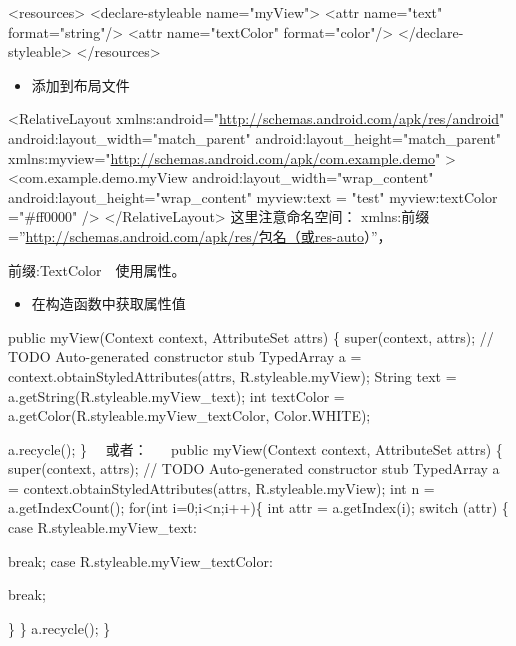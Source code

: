 \documentclass[9pt, b5paper]{article}
\begin{document}
<resources>
    <declare-styleable name="myView">
        <attr name="text" format="string"/>
        <attr name="textColor" format="color"/>
    </declare-styleable>
</resources>
\begin{itemize}
\item 添加到布局文件
\end{itemize}
<RelativeLayout xmlns:android="\url{http://schemas.android.com/apk/res/android}"
    android:layout\_width="match\_parent"
    android:layout\_height="match\_parent"
    xmlns:myview="\url{http://schemas.android.com/apk/com.example.demo}"
    >
     <com.example.demo.myView
         android:layout\_width="wrap\_content"
         android:layout\_height="wrap\_content" 
         myview:text = "test"
         myview:textColor ="\#ff0000"
         />
</RelativeLayout>
这里注意命名空间：
xmlns:前缀=”\url{http://schemas.android.com/apk/res/包名（或res-auto}）”，

前缀:TextColor　使用属性。
\begin{itemize}
\item 在构造函数中获取属性值
\end{itemize}
public myView(Context context, AttributeSet attrs) \{
        super(context, attrs);
        // TODO Auto-generated constructor stub
        TypedArray a = context.obtainStyledAttributes(attrs, R.styleable.myView); 
        String text = a.getString(R.styleable.myView\_text); 
        int textColor = a.getColor(R.styleable.myView\_textColor, Color.WHITE); 

        a.recycle();
    \}
　或者：
　
    public myView(Context context, AttributeSet attrs) \{
        super(context, attrs);
        // TODO Auto-generated constructor stub
        TypedArray a = context.obtainStyledAttributes(attrs, R.styleable.myView); 
        int n = a.getIndexCount();
        for(int i=0;i<n;i++)\{
            int attr = a.getIndex(i);
            switch (attr) \{
            case R.styleable.myView\_text:

    break;
case R.styleable.myView\_textColor:

break;

        \}
    \}
   a.recycle();
\}
\end{document}
